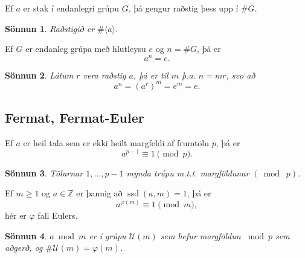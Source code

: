 \documentclass[a4paper,icelandic,11pt]{book}
\theoremstyle{plain}
\newtheorem*{sonnun}{Sönnun}
\newcommand{\Z}{\mathbb{Z}}
\DeclareMathOperator{\ssd}{ssd} %
\begin{document}
\begin{fylgisetn}
  Ef $a$ er stak í endanlegri grúpu $G$, þá gengur raðstig þess upp í $\#G$.
\end{fylgisetn}
\begin{sonnun}
  Raðstigið er $\#\langle a \rangle$.
\end{sonnun}
\begin{fylgisetn}
  Ef $G$ er endanleg grúpa með hlutleysu $e$ og $n = \#G$, þá er
 \[
 a^{n} = e.
 \]
\end{fylgisetn}
\begin{sonnun}
  Látum $r$ vera raðstig $a$, þá er til $m$ þ.a. $n = mr$, svo að
 \[
 a^n = \left( a^r \right)^{m} = e^{m} = e.
 \]

 \subsection{Fermat, Fermat-Euler}
\end{sonnun}
\begin{fylgisetn}
  Ef $a$ er heil tala sem er ekki heilt margfeldi af frumtölu $p$, þá er 
 \[
 a^{p-1} \equiv 1 \pmod p.
 \]
\end{fylgisetn}
\begin{sonnun}
  Tölurnar $1,\dots,p-1$ mynda trúpu m.t.t. margföldunar $(\bmod \;p)$.
\end{sonnun}
\begin{fylgisetn}
  Ef $m\ge 1$ og $a\in\Z$ er þannig að $\ssd(a,m) = 1$, þá er
 \[
 a^{\varphi(m)}\equiv 1 \pmod m,
 \]
 hér er $\varphi$ fall Eulers.
\end{fylgisetn}
\begin{sonnun}
  $a\bmod m$ er í grúpu $\mathcal U(m)$ sem hefur margföldun $\bmod p$ sem
  aðgerð, og $\#\mathcal U(m) = \varphi(m)$.
\end{sonnun}
\end{document}
